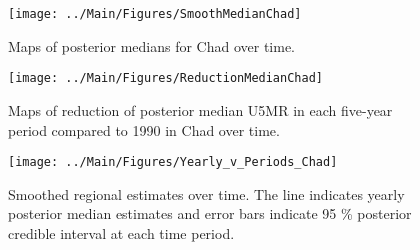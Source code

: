\documentclass[12pt]{article}\usepackage[]{graphicx}\usepackage[]{color}
\newenvironment{knitrout}{}{} %
\begin{document}
\begin{knitrout}
\color{fgcolor}\begin{figure}[bht]

{\centering \texttt{[image: ../Main/Figures/SmoothMedianChad]} 

}

\caption[Maps of posterior medians for Chad  over time]{Maps of posterior medians for Chad  over time.}\label{fig:unnamed-chunk-54}
\end{figure}


\end{knitrout}
\begin{knitrout}
\color{fgcolor}\begin{figure}[bht]

{\centering \texttt{[image: ../Main/Figures/ReductionMedianChad]} 

}

\caption[Maps of reduction of posterior median U5MR in each five-year period compared to 1990 in Chad over time]{Maps of reduction of posterior median U5MR in each five-year period compared to 1990 in Chad over time.}\label{fig:unnamed-chunk-55}
\end{figure}


\end{knitrout}
\begin{knitrout}
\color{fgcolor}\begin{figure}[bht]

{\centering \texttt{[image: ../Main/Figures/Yearly\_v\_Periods\_Chad]} 

}

\caption[Smoothed regional estimates over time]{Smoothed regional estimates over time. The line indicates yearly posterior median estimates and error bars indicate 95 \% posterior credible interval at each time period.}\label{fig:unnamed-chunk-56}
\end{figure}


\end{knitrout}
\end{document}
